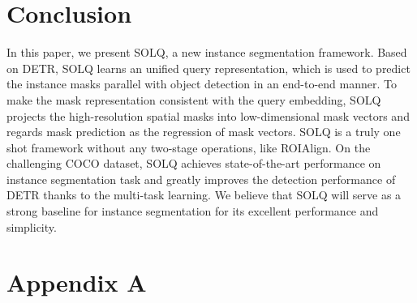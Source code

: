 \documentclass{article}
\begin{document}
\begin{table*}[h]
\label{tab:abs}
\end{table*}


\section{Conclusion}
In this paper, we present SOLQ, a new instance segmentation framework. Based on DETR, SOLQ learns an unified query representation, which is used to predict the instance masks parallel with object detection in an end-to-end manner. To make the mask representation consistent with the query embedding, SOLQ projects the high-resolution spatial masks into low-dimensional mask vectors and regards mask prediction as the regression of mask vectors. SOLQ is a truly one shot framework without any two-stage operations, like ROIAlign. On the challenging COCO dataset, SOLQ achieves state-of-the-art performance on instance segmentation task and greatly improves the detection performance of DETR thanks to the multi-task learning. We believe that SOLQ will serve as a strong baseline for instance segmentation for its excellent performance and simplicity.


{\small


}
\clearpage
\appendix

\section{Appendix A}
\end{document}
